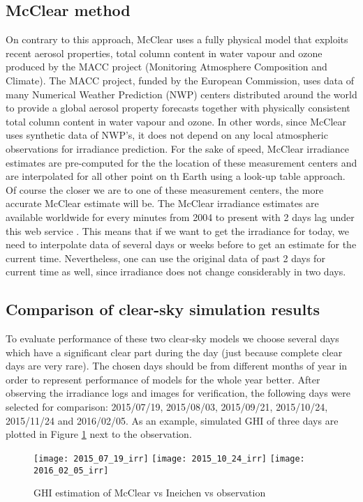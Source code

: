 \subsection{McClear method}
On contrary to this approach, McClear uses a fully physical model that exploits recent aerosol properties, total column content in water vapour and ozone produced by the MACC project (Monitoring Atmosphere Composition and Climate). The MACC project, funded by the European Commission, uses data of many Numerical Weather Prediction (NWP) centers distributed around the world to provide a global aerosol property forecasts together with physically consistent total column content in water vapour and ozone. In other words, since McClear uses synthetic data of NWP's, it does not depend on any local atmospheric observations for irradiance prediction. For the sake of speed, McClear irradiance estimates are pre-computed for the the location of these measurement centers and are interpolated for all other point on th Earth using a look-up table approach. Of course the closer we are to one of these measurement centers, the more accurate McClear estimate will be. The McClear irradiance estimates are available worldwide for every minutes from 2004 to present with 2 days lag under this web service \cite{mcclear_site}. This means that if we want to get the irradiance for today, we need to interpolate data of several days or weeks before to get an estimate for the current time. Nevertheless, one can use the original data of past 2 days for current time as well, since irradiance does not change considerably in two days.

\subsection{Comparison of clear-sky simulation results}
\label{sec:compare-clear-sky-result}
To evaluate performance of these two clear-sky models we choose several days which have a significant clear part during the day (just because complete clear days are very rare). The chosen days should be from different months of year in order to represent performance of models for the whole year better. After observing the irradiance logs and images for verification, the following days were selected for comparison: 2015/07/19, 2015/08/03, 2015/09/21, 2015/10/24, 2015/11/24 and 2016/02/05. As an example, simulated GHI of three days are plotted in Figure \ref{fig:mcclear_vs_Ineichen_days} next to the observation. 

\begin{figure}[!ht]
\caption{GHI estimation of McClear vs Ineichen vs observation}
\label{fig:mcclear_vs_Ineichen_days}
\texttt{[image: 2015\_07\_19\_irr]}
\texttt{[image: 2015\_10\_24\_irr]}
\texttt{[image: 2016\_02\_05\_irr]}
\centering
\end{figure}

